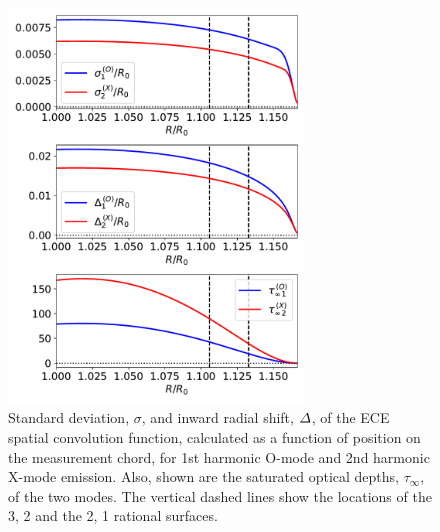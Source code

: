 \documentclass[12pt,prb,aps]{revtex4-1}
\begin{document}
\begin{figure}
\centerline{\includegraphics[width=0.7\textwidth]{Fig15.pdf}}
\caption{Standard deviation, $\sigma$, and inward radial shift, ${\mit\Delta}$, of the ECE spatial convolution function,  calculated as
a function of position on the measurement chord, for 1st harmonic O-mode and 2nd harmonic X-mode emission. Also, shown are the
saturated optical depths, $\tau_\infty$, of the two modes. The vertical dashed lines show the locations of the 3, 2 and the 2, 1 rational surfaces.}\label{fece}
\end{figure}
\end{document}
